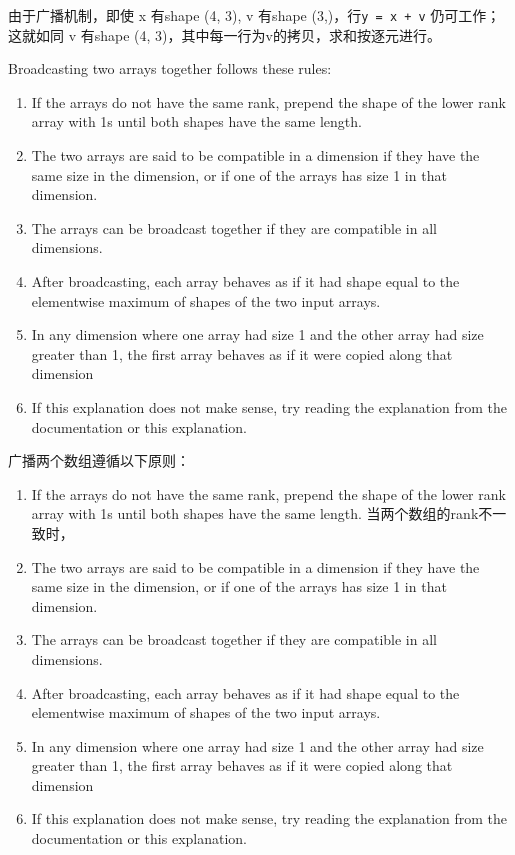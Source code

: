 \documentclass[10pt,a4paper]{article}
\begin{document}
由于广播机制，即使 x 有shape (4, 3), v 有shape (3,)，行\lstinline|y = x + v| 仍可工作； 这就如同 v 有shape (4, 3)，其中每一行为v的拷贝，求和按逐元进行。



Broadcasting two arrays together follows these rules:
\begin{enumerate}
\item If the arrays do not have the same rank, prepend the shape of the lower rank array with 1s until both shapes have the same length.
\item The two arrays are said to be compatible in a dimension if they have the same size in the dimension, or if one of the arrays has size 1 in that dimension.
\item The arrays can be broadcast together if they are compatible in all dimensions.
\item After broadcasting, each array behaves as if it had shape equal to the elementwise maximum of shapes of the two input arrays.
\item In any dimension where one array had size 1 and the other array had size greater than 1, the first array behaves as if it were copied along that dimension
\item If this explanation does not make sense, try reading the explanation from the documentation or this explanation.
\end{enumerate}

广播两个数组遵循以下原则：
\begin{enumerate}
        \item If the arrays do not have the same rank, prepend the shape of the lower rank array with 1s until both shapes have the same length.
        当两个数组的rank不一致时，
        \item The two arrays are said to be compatible in a dimension if they have the same size in the dimension, or if one of the arrays has size 1 in that dimension.
        \item The arrays can be broadcast together if they are compatible in all dimensions.
        \item After broadcasting, each array behaves as if it had shape equal to the elementwise maximum of shapes of the two input arrays.
        \item In any dimension where one array had size 1 and the other array had size greater than 1, the first array behaves as if it were copied along that dimension
        \item If this explanation does not make sense, try reading the explanation from the documentation or this explanation.
\end{enumerate}
\end{document}
